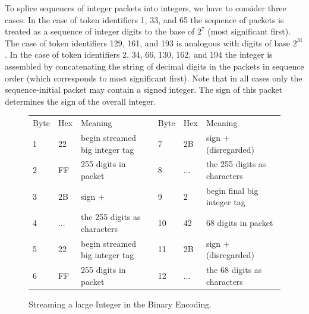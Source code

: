 \documentclass{report}
\begin{document}
\begin{description}
To splice sequences of integer packets into integers, we have to consider three cases: In
the case of token identifiers 1, 33, and 65 the sequence of packets is treated as a
sequence of integer digits to the base of $2^7$ (most significant first). The case of
token identifiers 129, 161, and 193 is analogous with digits of base $2^{31}$. In the case
of token identifiers 2, 34, 66, 130, 162, and 194 the integer is assembled by
concatenating the string of decimal digits in the packets in sequence order (which
corresponds to most significant first).  Note that in all cases only the sequence-initial
packet may contain a signed integer. The sign of this packet determines the sign of the
overall integer.


\begin{figure}\centering
\begin{tabular}{llllll}
  Byte &Hex &Meaning &  Byte &Hex &Meaning \\
  1 &22 &begin streamed big integer tag & 7 &2B &sign + (disregarded)\\
  2 &FF &255 digits in packet &  8 &... & the 255 digits as characters \\
  3 &2B &sign + & 9 &2 &begin final big integer tag\\
  4 &... & the 255 digits as characters & 10 &42 &68 digits in packet \\
  5 &22 &begin streamed big integer tag & 11 &2B &sign + (disregarded) \\
  6 &FF &255 digits in packet & 12 &... & the 68 digits as characters 
\end{tabular}
\caption{Streaming a large Integer in the Binary Encoding.}\label{fig_bin-enc_stream}
\end{figure}


\end{description}
\end{document}
